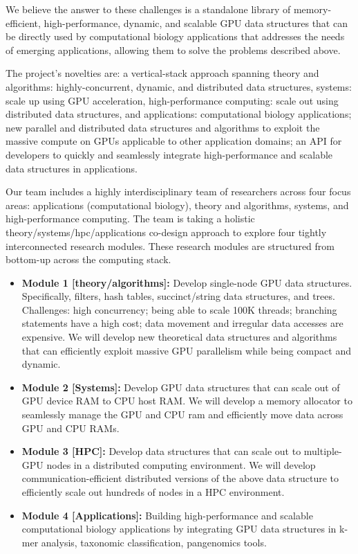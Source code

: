 We believe the answer to these challenges is a standalone library of
memory-efficient, high-performance, dynamic, and scalable GPU data structures
that can be directly used by computational biology applications that addresses
the needs of emerging applications, allowing them to solve the problems
described above.

The project’s novelties are: a vertical-stack approach spanning theory and
algorithms: highly-concurrent, dynamic, and distributed data structures,
systems: scale up using GPU acceleration, high-performance computing: scale out
using distributed data structures, and applications: computational biology
applications; new parallel and distributed data structures and algorithms to
exploit the massive compute on GPUs applicable to other application domains; an
API for developers to quickly and seamlessly integrate high-performance and
scalable data structures in applications.

Our team includes a highly interdisciplinary team of researchers across four
focus areas: applications (computational biology), theory and algorithms,
systems, and high-performance computing. The team is taking a holistic
theory/systems/hpc/applications co-design approach to explore four tightly
interconnected research modules.
These research modules are structured from bottom-up across the computing stack.

\begin{itemize}[noitemsep, leftmargin=*]
  \item {\bf Module 1 [theory/algorithms]:} Develop single-node GPU data structures.
    Specifically, filters, hash tables, succinct/string data structures, and
    trees. Challenges: high concurrency; being able to scale 100K threads;
    branching statements have a high cost; data movement and irregular data
    accesses are expensive. We will develop new theoretical data structures and
    algorithms that can efficiently exploit massive GPU parallelism while being
    compact and dynamic.

  \item {\bf Module 2 [Systems]:} Develop GPU data structures that can scale out of
      GPU device RAM to CPU host RAM. We will develop a memory allocator to
      seamlessly manage the GPU and CPU ram and efficiently move data across GPU
      and CPU RAMs.

    \item {\bf Module 3 [HPC]:} Develop data structures that can scale out to
      multiple-GPU nodes in a distributed computing environment. We will develop
      communication-efficient distributed versions of the above data structure
      to efficiently scale out hundreds of nodes in a HPC environment.

    \item {\bf Module 4 [Applications]:} Building high-performance and scalable
      computational biology applications by integrating GPU data structures in
      k-mer analysis, taxonomic classification, pangenomics tools.

\end{itemize}

